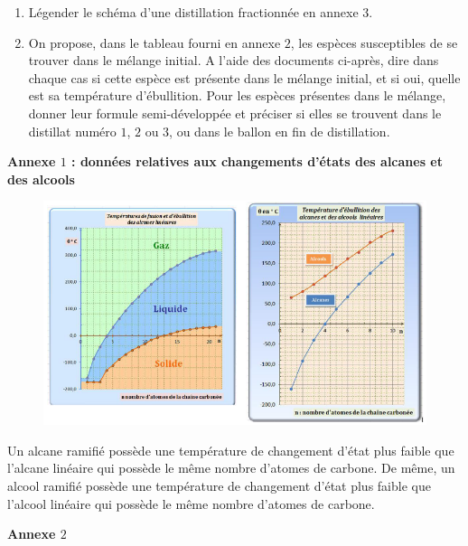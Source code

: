 \begin{enumerate}

\item Légender le schéma d'une distillation fractionnée en annexe $3$.

\item On propose, dans le tableau fourni en annexe $2$, les espèces susceptibles de se trouver dans le mélange initial.\newline
A l'aide des documents ci-après, dire dans chaque cas si cette espèce est présente dans le mélange initial, et si oui, quelle est sa température d'ébullition. Pour les espèces présentes dans le mélange, donner leur formule semi-développée et préciser si elles se trouvent dans le distillat numéro $1$, $2$ ou $3$, ou dans le ballon en fin de distillation.

\end{enumerate}


\newpage

\textbf{Annexe $1$ : données relatives aux changements d'états des alcanes et des alcools}

\begin{figure}[h]
\begin{center}
\includegraphics[width=0.5\columnwidth]{images/Exo6_Alcanes_Alcools_Donnees}
\end{center}
\end{figure}

Un alcane ramifié possède une température de changement d'état plus faible que l'alcane linéaire qui possède le même nombre d'atomes de carbone.\newline
De même, un alcool ramifié possède une température de changement d'état plus faible que l'alcool linéaire qui possède le même nombre d'atomes de carbone.

\vspace{0.3cm}


\textbf{Annexe $2$}

